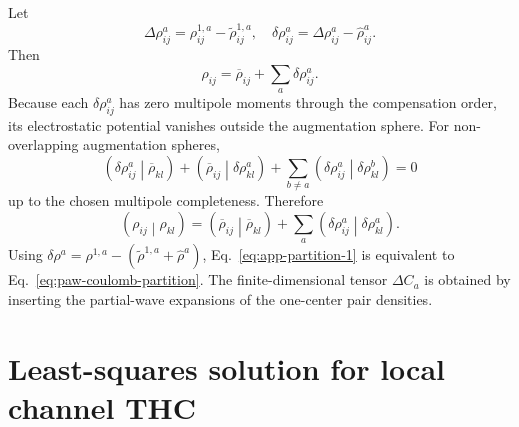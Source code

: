 \documentclass[aps,prb,reprint,superscriptaddress,longbibliography,nofootinbib]{revtex4-2}
\newcommand{\coul}[2]{\left(#1\middle|#2\right)}
\begin{document}
Let
\begin{equation}
\Delta\rho_{ij}^{a}=\rho_{ij}^{1,a}-\widetilde\rho_{ij}^{1,a},
\quad
\delta\rho_{ij}^{a}=\Delta\rho_{ij}^{a}-\widehat\rho_{ij}^{a}.
\label{eq:app-deltarho}
\end{equation}
Then
\begin{equation}
\rho_{ij}
=\overline\rho_{ij}+
\sum_a\delta\rho_{ij}^{a}.
\label{eq:app-rho-split}
\end{equation}
Because each \(\delta\rho_{ij}^{a}\) has zero multipole moments through the compensation order, its electrostatic potential vanishes outside the augmentation sphere.  For non-overlapping augmentation spheres,
\begin{equation}
\coul{\delta\rho_{ij}^{a}}{\overline\rho_{kl}}+
\coul{\overline\rho_{ij}}{\delta\rho_{kl}^{a}}
+
\sum_{b\ne a}\coul{\delta\rho_{ij}^{a}}{\delta\rho_{kl}^{b}}=0
\label{eq:app-cross-vanish}
\end{equation}
up to the chosen multipole completeness.  Therefore
\begin{equation}
\coul{\rho_{ij}}{\rho_{kl}}
=\coul{\overline\rho_{ij}}{\overline\rho_{kl}}
+
\sum_a\coul{\delta\rho_{ij}^{a}}{\delta\rho_{kl}^{a}}.
\label{eq:app-partition-1}
\end{equation}
Using \(\delta\rho^a=\rho^{1,a}-(\widetilde\rho^{1,a}+\widehat\rho^a)\), Eq.~\eqref{eq:app-partition-1} is equivalent to Eq.~\eqref{eq:paw-coulomb-partition}.  The finite-dimensional tensor \(\Delta C_a\) is obtained by inserting the partial-wave expansions of the one-center pair densities.

\section{Least-squares solution for local channel THC}
\label{app:localfit}
\end{document}
